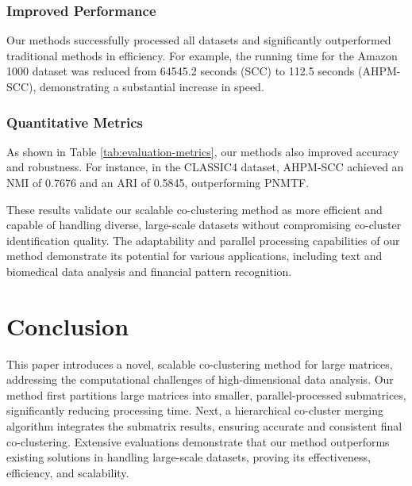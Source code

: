 \documentclass[letterpaper, 10 pt, conference]{ieeeconf}  %
\begin{document}
\subsubsection{Improved Performance} Our methods successfully processed all datasets and significantly outperformed traditional methods in efficiency. For example, the running time for the Amazon 1000 dataset was reduced from 64545.2 seconds (SCC) to 112.5 seconds (AHPM-SCC), demonstrating a substantial increase in speed.

\subsubsection{Quantitative Metrics} As shown in Table \ref{tab:evaluation-metrics}, our methods also improved accuracy and robustness. For instance, in the CLASSIC4 dataset, AHPM-SCC achieved an NMI of 0.7676 and an ARI of 0.5845, outperforming PNMTF.

These results validate our scalable co-clustering method as more efficient and capable of handling diverse, large-scale datasets without compromising co-cluster identification quality. The adaptability and parallel processing capabilities of our method demonstrate its potential for various applications, including text and biomedical data analysis and financial pattern recognition.


\section{Conclusion}
\label{sec:conclude}
This paper introduces a novel, scalable co-clustering method for large matrices, addressing the computational challenges of high-dimensional data analysis. Our method first partitions large matrices into smaller, parallel-processed submatrices, significantly reducing processing time. Next, a hierarchical co-cluster merging algorithm integrates the submatrix results, ensuring accurate and consistent final co-clustering. Extensive evaluations demonstrate that our method outperforms existing solutions in handling large-scale datasets, proving its effectiveness, efficiency, and scalability.
\end{document}
